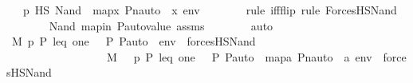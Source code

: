 \begin{isabellebody}
\ {\isachardoublequoteopen}{\isachardot}{\kern0pt}{\isachardot}{\kern0pt}{\isachardot}{\kern0pt}\ {\isasymlongleftrightarrow}\ {\isasympi}{\isacharbackquote}{\kern0pt}p\ {\isasymtturnstile}HS\ Nand{\isacharparenleft}{\kern0pt}{\isasymphi}{\isacharcomma}{\kern0pt}\ {\isasympsi}{\isacharparenright}{\kern0pt}\ map{\isacharparenleft}{\kern0pt}{\isasymlambda}x{\isachardot}{\kern0pt}\ Pn{\isacharunderscore}{\kern0pt}auto{\isacharparenleft}{\kern0pt}{\isasympi}{\isacharparenright}{\kern0pt}\ {\isacharbackquote}{\kern0pt}\ x{\isacharcomma}{\kern0pt}\ env{\isacharparenright}{\kern0pt}{\isachardoublequoteclose}\ \isanewline
\ \ \ \ \ \ \isamarkupfalse%
{\isacharparenleft}{\kern0pt}rule\ iff{\isacharunderscore}{\kern0pt}flip{\isacharcomma}{\kern0pt}\ rule\ ForcesHS{\isacharunderscore}{\kern0pt}Nand{\isacharparenright}{\kern0pt}\isanewline
\ \ \ \ \ \ \isamarkupfalse%
\ Nand\ mapin\ P{\isacharunderscore}{\kern0pt}auto{\isacharunderscore}{\kern0pt}value\ assms\isanewline
\ \ \ \ \ \ \isamarkupfalse%
\ auto\isanewline
\ \ \ \ \isamarkupfalse%
\ \isamarkupfalse%
\ {\isachardoublequoteopen}M{\isacharcomma}{\kern0pt}\ {\isacharbrackleft}{\kern0pt}p{\isacharcomma}{\kern0pt}\ P{\isacharcomma}{\kern0pt}\ leq{\isacharcomma}{\kern0pt}\ one{\isacharcomma}{\kern0pt}\ {\isasymlangle}{\isasymF}{\isacharcomma}{\kern0pt}\ {\isasymG}{\isacharcomma}{\kern0pt}\ P{\isacharcomma}{\kern0pt}\ P{\isacharunderscore}{\kern0pt}auto{\isasymrangle}{\isacharbrackright}{\kern0pt}\ {\isacharat}{\kern0pt}\ env\ {\isasymTurnstile}\ forcesHS{\isacharparenleft}{\kern0pt}Nand{\isacharparenleft}{\kern0pt}{\isasymphi}{\isacharcomma}{\kern0pt}\ {\isasympsi}{\isacharparenright}{\kern0pt}{\isacharparenright}{\kern0pt}\ {\isasymlongleftrightarrow}\isanewline
\ \ \ \ \ \ \ \ \ \ \ \ \ \ \ \ \ \ M{\isacharcomma}{\kern0pt}\ {\isacharbrackleft}{\kern0pt}{\isasympi}\ {\isacharbackquote}{\kern0pt}\ p{\isacharcomma}{\kern0pt}\ P{\isacharcomma}{\kern0pt}\ leq{\isacharcomma}{\kern0pt}\ one{\isacharcomma}{\kern0pt}\ {\isasymlangle}{\isasymF}{\isacharcomma}{\kern0pt}\ {\isasymG}{\isacharcomma}{\kern0pt}\ P{\isacharcomma}{\kern0pt}\ P{\isacharunderscore}{\kern0pt}auto{\isasymrangle}{\isacharbrackright}{\kern0pt}\ {\isacharat}{\kern0pt}\ map{\isacharparenleft}{\kern0pt}{\isasymlambda}a{\isachardot}{\kern0pt}\ Pn{\isacharunderscore}{\kern0pt}auto{\isacharparenleft}{\kern0pt}{\isasympi}{\isacharparenright}{\kern0pt}\ {\isacharbackquote}{\kern0pt}\ a{\isacharcomma}{\kern0pt}\ env{\isacharparenright}{\kern0pt}\ {\isasymTurnstile}\ forcesHS{\isacharparenleft}{\kern0pt}Nand{\isacharparenleft}{\kern0pt}{\isasymphi}{\isacharcomma}{\kern0pt}\ {\isasympsi}{\isacharparenright}{\kern0pt}{\isacharparenright}{\kern0pt}{\isachardoublequoteclose}\ \isanewline

\end{isabellebody}
